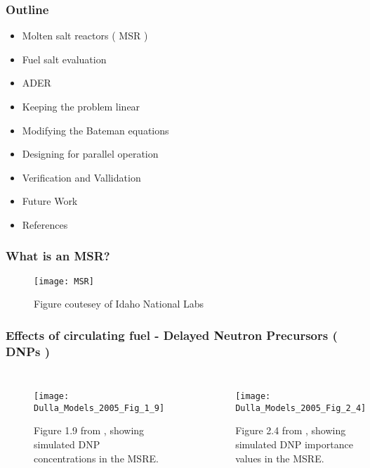 \documentclass{beamer}
\title[Modelling of Material Transfers in Reactor Fuel Burnup Simulations]
\author{Daniel D. Wooten}
\institute{UC Berkeley}
\date{October 20\textsuperscript{th}, 2017}
\begin{document}
\frame{\titlepage}

\begin{frame}

\frametitle{Outline}

    \begin{itemize}
        \item Molten salt reactors ( MSR ) 
        \item Fuel salt evaluation 
        \item ADER
        \item Keeping the problem linear
        \item Modifying the Bateman equations
        \item Designing for parallel operation
        \item Verification and Vallidation
        \item Future Work
        \item References
    \end{itemize}

\end{frame}

\begin{frame}
\frametitle{What is an MSR?}

    \begin{figure}
        \centering
        \texttt{[image: MSR]}
        \caption{Figure coutesey of Idaho National Labs}
        \label{fig:msr_pic}
    \end{figure}

\end{frame}

\begin{frame}
\frametitle{Effects of circulating fuel - Delayed Neutron Precursors ( DNPs )}

    \begin{columns}


        \begin{figure}
            \centering
            \texttt{[image: Dulla\_Models\_2005\_Fig\_1\_9]}
            \caption{Figure 1.9 from \cite{dulla_models_2005}, showing 
            simulated DNP concentrations in the MSRE.}
            \label{fig:dulla_models_c}
        \end{figure}

        \column{0.5\paperwidth}

        \begin{figure}
            \centering
            \texttt{[image: Dulla\_Models\_2005\_Fig\_2\_4]}
            \caption{Figure 2.4 from \cite{dulla_models_2005}, showing simulated
            DNP importance values in the MSRE.}
            \label{fig:dulla_models_c_star}
        \end{figure}

    \end{columns}

\end{frame}
\end{document}
